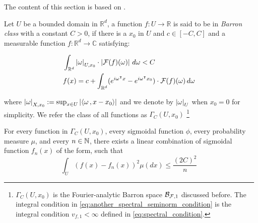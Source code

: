 The content of this section is based on
\cite{barronUniversalApproximationBounds1993}.

\begin{definition}
    \label{def:fourier_class}
    Let $U$ be a bounded domain in $\mathbb{R}^d$, a function $f: U \to
    \mathbb{R}$ is said to be in \textit{Barron class} with a constant $C > 0$,
    if there is a $x_0$ in $U$ and $c \in [-C, C]$ and a measurable function $f:
    \mathbb{R}^d \to \mathbb{C}$ satisfying:

    \begin{align}
        & \int_{\mathbb{R}^d} \left| \omega \right|_{U, x_0} 
        \cdot \left| \mathcal{F}(f)(\omega) \right| \,d\omega < C 
        \label{eq:another_spectral_seminorm_condition} \\
        & f(x) = c + \int_{\mathbb{R}^d} (
            e^{i\omega{}^{\intercal} x} - e^{i\omega{}^{\intercal} x_0}
        ) \cdot \mathcal{F}(f)(\omega)\,d\omega
    \end{align}

    where $\left| \omega \right|_{X, x_0} := \sup_{x\in U}\left| \left\langle \omega\, , x - x_0 \right\rangle \right|$
    and we denote by $\left| \omega \right|_U$ when $x_0 = 0$ for simplicity. We refer
    the class of all functions as $\Gamma_C(U, x_0)$
    \footnote{
        $\Gamma_C(U, x_0)$ is the Fourier-analytic Barron space
        $\mathcal{B}_{\mathcal{F}, 1}$ discussed before. The integral condition in
        \eqref{eq:another_spectral_seminorm_condition} is the integral condition
        $v_{f,1} < \infty$ defined in \eqref{eq:spectral_condition}.
    }
\end{definition}

\begin{theorem}\cite[Theorem~1]{barronUniversalApproximationBounds1993}\label{thm:barron_1993_1}
    For every function in $\Gamma_C(U, x_0)$, every sigmoidal function $\phi$,
    every probability measure $\mu$, and every $n \in \mathbb{N}$, there exists a linear
    combination of sigmoidal function $f_n(x)$ of the form, such that
    \begin{equation}
        \int_U(f(x) - f_n(x))^2 \mu(dx) \leq \frac{(2C)^2}{n}
    \end{equation}
\end{theorem}


